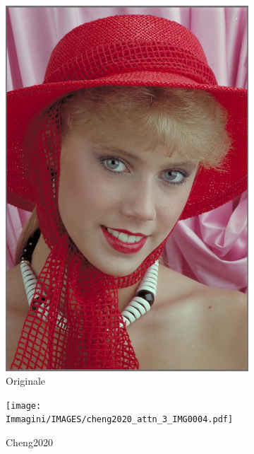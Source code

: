 \newpage
\begin{figure}[t!]
    \centering
    \begin{subfigure}[]{0.25\textwidth}
        \includegraphics[width=\textwidth]{Immagini/IMAGES/PNG_IMG0004.pdf}
        \caption{Originale}
        \label{fig:OriginalChang2020}
    \end{subfigure}
    \hspace*{0.5cm}
    \begin{subfigure}[]{0.25\textwidth}
        \texttt{[image: Immagini/IMAGES/cheng2020\_attn\_3\_IMG0004.pdf]}
        \caption{Cheng2020}
        \label{fig:CompressedCheng2020}
    \end{subfigure}
    \hspace*{0.5cm}
    \begin{subfigure}[]{0.25\textwidth}

\end{subfigure}
\end{figure}
